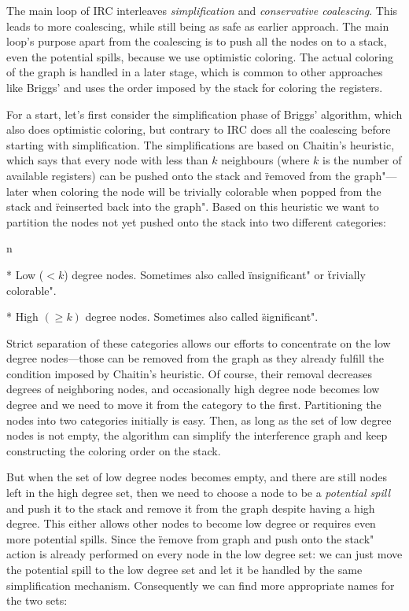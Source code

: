 The main loop of IRC interleaves {\em simplification} and {\em conservative
coalescing}. This leads to more coalescing, while still being as safe as earlier
approach. The main
loop's purpose apart from the coalescing is to push all the nodes on to a
stack, even the potential spills, because we use optimistic coloring. The actual
coloring of the graph is handled in a later stage, which is common to other
approaches like Briggs' and uses the order imposed by the stack for
coloring the registers.

For a start, let's first consider the simplification phase of Briggs' algorithm,
which also does optimistic coloring, but contrary to IRC does all the coalescing
before starting with simplification. The simplifications are based on
Chaitin's heuristic, which says that every node with less than $k$
neighbours (where $k$ is the number of available registers) can be pushed onto
the stack and \"removed from the graph"---later when coloring the node will be
trivially colorable when popped from the stack and \"reinserted back into the
graph". Based on this heuristic we want to partition the nodes not yet pushed
onto the stack into two different categories:

\begitems \style n

* Low ($<k$) degree nodes. Sometimes also called \"insignificant" or \"trivially
colorable".

* High $(\geq k)$ degree nodes. Sometimes also called \"significant".

\enditems

Strict separation of these categories allows our efforts to concentrate on the
low degree nodes---those can be removed from the graph as they already fulfill
the condition imposed by Chaitin's heuristic. Of course, their removal
decreases degrees of neighboring nodes, and occasionally high degree node
becomes low degree and we need to move it from the category to the first.
Partitioning the nodes into two categories initially is easy. Then, as long as the set
of low degree nodes is not empty, the algorithm can simplify the interference
graph and keep constructing the coloring order on the stack.

But when the set of low degree nodes becomes empty, and there are still nodes
left in the high degree set, then we need to choose a node to be a {\em
potential spill} and push it to the stack and remove it from the graph despite
having a high degree. This either allows other nodes to become low degree or
requires even more potential spills. Since the \"remove from graph and push onto
the stack" action is already performed on every node in the low degree set: we
can just move the potential spill to the low degree set and let it be handled by
the same simplification mechanism. Consequently we can find more appropriate names
for the two sets:

